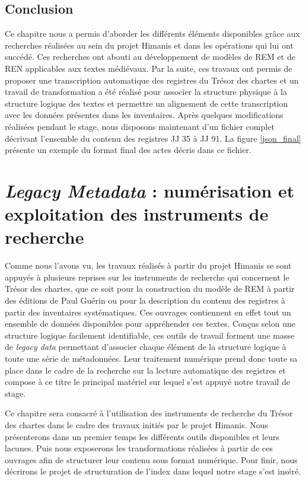 \documentclass[a4paper,12pt,twoside]{book}
\begin{document}
	
	\section*{Conclusion}
	
	Ce chapitre nous a permis d'aborder les différents éléments disponibles grâce aux recherches réalisées au sein du projet Himanis et dans les opérations qui lui ont succédé. Ces recherches ont abouti au développement de modèles de REM et de REN applicables aux textes médiévaux. Par la suite, ces travaux ont permis de proposer une transcription automatique des registres du Trésor des chartes et un travail de transformation a été réalisé pour associer la structure physique à la structure logique des textes et permettre un alignement de cette transcription avec les données présentes dans les inventaires. Après quelques modifications réalisées pendant le stage, nous disposons maintenant d'un fichier complet décrivant l'ensemble du contenu des registres JJ 35 à JJ 91. La figure \ref{json_final} présente un exemple du format final des actes décris dans ce fichier.
	
	
	\chapter{\textit{Legacy Metadata} : numérisation et exploitation des instruments de recherche}
	
	Comme nous l'avons vu, les travaux réalisés à partir du projet Himanis se sont appuyés à plusieurs reprises sur les instruments de recherche qui concernent le Trésor des chartes, que ce soit pour la construction du modèle de REM à partir des éditions de Paul Guérin ou pour la description du contenu des registres à partir des inventaires systématiques. Ces ouvrages contiennent en effet tout un ensemble de données disponibles pour appréhender ces textes. Conçus selon une structure logique facilement identifiable, ces outils de travail forment une masse de \textit{legacy data} permettant d'associer chaque élément de la structure logique à toute une série de métadonnées. Leur traitement numérique prend donc toute sa place dans le cadre de la recherche sur la lecture automatique des registres et compose à ce titre le principal matériel sur lequel s'est appuyé notre travail de stage.
	
	Ce chapitre sera consacré à l'utilisation des instruments de recherche du Trésor des chartes dans le cadre des travaux initiés par le projet Himanis. Nous présenterons dans un premier temps les différents outils disponibles et leurs lacunes. Puis nous exposerons les transformations réalisées à partir de ces ouvrages afin de structurer leur contenu sous format numérique. Pour finir, nous décrirons le projet de structuration de l'index dans lequel notre stage s'est inséré.
	
\end{document}
